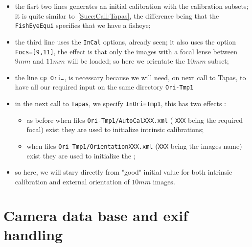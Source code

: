 \begin{itemize}
   \item  the fisrt two lines generates an initial calibration  with the calibration subsets;
          it is quite similar to~\ref{Succ:Call:Tapas}, the difference being that the 
          {\tt FishEyeEqui} specifies that we have a fisheye;

   \item  the third line uses the  {\tt InCal} options, already seen;  it also
          uses the option {\tt Focs=[9,11]}, the effect is   that only the images
          with a focal lense between $9mm$ and $11mm$ will be loaded; so here we orientate
          the $10mm$ subset;

   \item the line {\tt cp Ori\dots}, is necessary because we will need, on next call to Tapas,
         to have all our required input on the same directory {\tt Ori-Tmp1}

    \item in the next call to {\tt Tapas}, we specify {\tt InOri=Tmp1},  this has two effects :
         
\begin{itemize}
         \item  as before when files {\tt Ori-Tmp1/AutoCalXXX.xml} ( {\tt XXX} being the required focal) exist
                they are used to initialize intrinsic calibrations;

         \item  when files  {\tt Ori-Tmp1/OrientationXXX.xml} ({\tt XXX} being the images
                name) exist they are used to initialize the ;%
\end{itemize}
    \item  so here, we will stary directly from "good" initial value for both intrinsic calibration
           and external orientation of $10mm$ images.

\end{itemize}



\section{Camera data base and exif handling}

